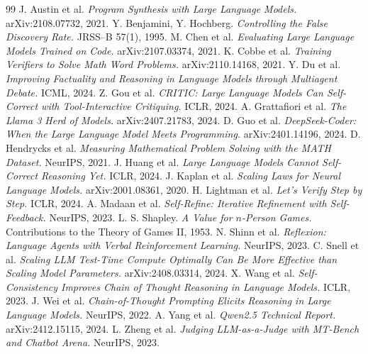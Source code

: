 \documentclass[12pt,a4paper]{article}
\begin{document}
\begin{thebibliography}{99}\small
{} J. Austin et al. \emph{Program Synthesis with Large Language Models.}
arXiv:2108.07732, 2021.
 Y. Benjamini, Y. Hochberg. \emph{Controlling the False Discovery Rate.}
JRSS--B 57(1), 1995.
 M. Chen et al. \emph{Evaluating Large Language Models Trained on Code.}
arXiv:2107.03374, 2021.
 K. Cobbe et al. \emph{Training Verifiers to Solve Math Word Problems.}
arXiv:2110.14168, 2021.
 Y. Du et al. \emph{Improving Factuality and Reasoning in Language Models
through Multiagent Debate.} ICML, 2024.
 Z. Gou et al. \emph{CRITIC: Large Language Models Can Self-Correct with
Tool-Interactive Critiquing.} ICLR, 2024.
 A. Grattafiori et al. \emph{The Llama 3 Herd of Models.}
arXiv:2407.21783, 2024.
 D. Guo et al. \emph{DeepSeek-Coder: When the Large Language Model Meets
Programming.} arXiv:2401.14196, 2024.
 D. Hendrycks et al. \emph{Measuring Mathematical Problem Solving with
the MATH Dataset.} NeurIPS, 2021.
 J. Huang et al. \emph{Large Language Models Cannot Self-Correct Reasoning
Yet.} ICLR, 2024.
 J. Kaplan et al. \emph{Scaling Laws for Neural Language Models.}
arXiv:2001.08361, 2020.
 H. Lightman et al. \emph{Let's Verify Step by Step.} ICLR, 2024.
 A. Madaan et al. \emph{Self-Refine: Iterative Refinement with
Self-Feedback.} NeurIPS, 2023.
 L. S. Shapley. \emph{A Value for $n$-Person Games.} Contributions to the
Theory of Games II, 1953.
 N. Shinn et al. \emph{Reflexion: Language Agents with Verbal Reinforcement
Learning.} NeurIPS, 2023.
 C. Snell et al. \emph{Scaling LLM Test-Time Compute Optimally Can Be More
Effective than Scaling Model Parameters.} arXiv:2408.03314, 2024.
 X. Wang et al. \emph{Self-Consistency Improves Chain of Thought Reasoning in
Language Models.} ICLR, 2023.
 J. Wei et al. \emph{Chain-of-Thought Prompting Elicits Reasoning in Large
Language Models.} NeurIPS, 2022.
 A. Yang et al. \emph{Qwen2.5 Technical Report.} arXiv:2412.15115, 2024.
 L. Zheng et al. \emph{Judging LLM-as-a-Judge with MT-Bench and Chatbot
Arena.} NeurIPS, 2023.
\end{thebibliography}
\end{document}

